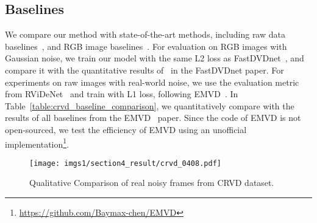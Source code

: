 \documentclass[sigconf]{acmart}
\begin{document}
\subsection{Baselines}
We compare our method with state-of-the-art methods, including raw data baselines~\cite{Maggioni2021Efficient,yue2020supervised,Tassano2020FastDVDNet}, and RGB image baselines~\cite{Maggioni2012VBM4D,Tassano2020FastDVDNet,tassano2019dvdnet,Arias2018VNLB,Vaksman2021Patch,Xiang2022ReMoNet,Sheth2021UDVD}.
For evaluation on RGB images with Gaussian noise, we train our model with the same L2 loss as FastDVDnet~\cite{Tassano2020FastDVDNet}, and compare it with the quantitative results of~\cite{Maggioni2012VBM4D,Tassano2020FastDVDNet,tassano2019dvdnet,Arias2018VNLB} in the FastDVDnet paper. 
For experiments on raw images with real-world noise, we use the evaluation metric from 
RViDeNet~\cite{yue2020supervised} and train with L1 loss, 
following EMVD~\cite{Maggioni2021Efficient}.
In Table~\ref{table:crvd_baseline_comparison}, we quantitatively compare with the results of all baselines from the EMVD~\cite{Maggioni2021Efficient} paper. Since the code of EMVD is not open-sourced, we test the efficiency of EMVD using an unofficial implementation\footnote{\url{https://github.com/Baymax-chen/EMVD}}.




\begin{figure*}[t]
\centering
\texttt{[image: imgs1/section4\_result/crvd\_0408.pdf]}
\caption{Qualitative Comparison of real noisy frames from CRVD dataset. 
}
\label{fig:visual_crvd}
\end{figure*}
\end{document}
